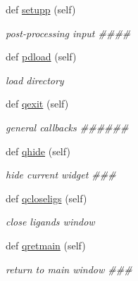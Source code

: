 \begin{DoxyCompactItemize}
def \hyperlink{classmolSimplify_1_1Classes_1_1mGUI_1_1mGUI_a9c8cf2d3bb992f4307fd2558ff6bc8f9}{setupp} (self)
\begin{DoxyCompactList}\small\item\em post-\/processing input \#\#\#\# \end{DoxyCompactList}\item 
def \hyperlink{classmolSimplify_1_1Classes_1_1mGUI_1_1mGUI_ab53d988bb1211fa888dfb3696544687d}{pdload} (self)
\begin{DoxyCompactList}\small\item\em load directory \end{DoxyCompactList}\item 
def \hyperlink{classmolSimplify_1_1Classes_1_1mGUI_1_1mGUI_ab6381818aedb80bd3809e962a1cf99c6}{qexit} (self)
\begin{DoxyCompactList}\small\item\em general callbacks \#\#\#\#\#\# \end{DoxyCompactList}\item 
def \hyperlink{classmolSimplify_1_1Classes_1_1mGUI_1_1mGUI_aeac67a6cda3f174b61b3e8107f0f6fcb}{qhide} (self)
\begin{DoxyCompactList}\small\item\em hide current widget \#\#\# \end{DoxyCompactList}\item 
def \hyperlink{classmolSimplify_1_1Classes_1_1mGUI_1_1mGUI_acede96b07a31f45ba28aeba299615e35}{qcloseligs} (self)
\begin{DoxyCompactList}\small\item\em close ligands window \end{DoxyCompactList}\item 
def \hyperlink{classmolSimplify_1_1Classes_1_1mGUI_1_1mGUI_ad0d3da9f93744ea5acc8e87c33a33806}{qretmain} (self)
\begin{DoxyCompactList}\small\item\em return to main window \#\#\# \end{DoxyCompactList}\end{DoxyCompactItemize}
